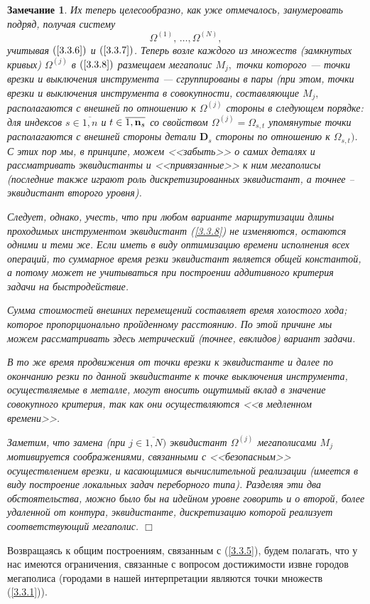 \documentclass[11pt,twoside,openany]{report}
\newcommand{\bmn}{{\bf n}}
\newcommand{\bfn}{\begin{equation}}
\newcommand{\efn}{\end{equation}}
\newcommand{\ov}{\overline}
\newcounter{theo}
\newcounter{zam}
\newtheorem{zam}{Замечание}[section]
\newcommand{\Om}{\Omega}
\begin{document}
\begin{zam}
Их теперь целесообразно, как уже отмечалось, занумеровать подряд, получая систему
\bfn
  \label{3.3.8}
  \Om^{(1)},\,\ldots,\Om^{(N)}
  ,
\efn
учитывая
$(\ref{3.3.6})$ и $(\ref{3.3.7})$.
Теперь возле каждого из множеств
(замкнутых кривых)
$\Om^{(j)}$ в $(\ref{3.3.8})$
размещаем мегаполис $M_j,$
точки которого --- точки врезки и выключения инструмента --- сгруппированы в пары
(при этом, точки врезки и выключения инструмента в совокупности,
составляющие $M_j,$
располагаются с внешней по отношению к $\Om^{(j)}$ стороны в следующем порядке:
для индексов
$s\in \ov{1,n}$ и $t\in \ov{1,\bmn_s}$
со свойством $\Om^{(j)} = \Om_{s,t}$
упомянутые точки располагаются с внешней
стороны детали
$\mathbf{D}_s$ стороны по
отношению к $\Om_{s,t})$.
С этих пор мы, в принципе, можем <<забыть>> о самих деталях
и рассматривать эквидистанты и <<привязанные>> к ним мегаполисы
(последние также играют
роль дискретизированных эквидистант,
а точнее -- эквидистант второго уровня).

Следует, однако, учесть,
что при любом варианте маршрутизации длины проходимых
инструментом эквидистант (\ref{3.3.8})
не изменяются, остаются одними и теми же.
Если иметь в виду оптимизацию времени исполнения всех операций,
то суммарное время
резки эквидистант является общей константой,
а потому может не учитываться  при
построении аддитивного критерия задачи на быстродействие.

Сумма стоимостей внешних перемещений составляет время холостого хода;
которое пропорционально пройденному расстоянию.
По этой причине мы можем рассматривать
здесь метрический
(точнее, евклидов) вариант задачи.

В то же время продвижения от точки врезки к эквидистанте и далее
по окончанию резки по данной эквидистанте
к точке выключения инструмента, осуществляемые в металле,
могут вносить ощутимый вклад в значение совокупного критерия,
так как они осуществляются <<в медленном времени>>.

Заметим, что замена (при $j\in \ov{1,N})$ эквидистант $\Om^{(j)}$
мегаполисами
$M_j$
мотивируется соображениями, связанными с <<безопасным>> осуществлением врезки,
и касающимися вычислительной реализации
(имеется в виду построение локальных задач переборного типа).
Разделяя эти два обстоятельства,
можно было бы на идейном уровне говорить и о второй,
более удаленной от контура, эквидистанте,
дискретизацию которой реализует соответствующий мегаполис.
\hfill $\Box$
\end{zam}

Возвращаясь к общим построениям,
связанным с (\ref{3.3.5}),
будем полагать, что
у нас имеются ограничения, связанные с вопросом достижимости извне городов
мегаполиса
(городами в нашей интерпретации являются точки множеств (\ref{3.3.1})).
\end{document}
